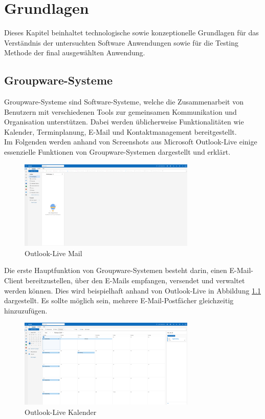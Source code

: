 \chapter{Grundlagen}

Dieses Kapitel beinhaltet technologische sowie konzeptionelle Grundlagen für das \\
Verständnis der untersuchten Software Anwendungen sowie für die Testing Methode der final ausgewählten Anwendung.

\section{Groupware-Systeme}

Groupware-Systeme sind Software-Systeme, welche die Zusammenarbeit von Benutzern mit verschiedenen Tools zur gemeinsamen Kommunikation und Organisation unterstützen.
Dabei werden üblicherweise Funktionalitäten wie Kalender, Terminplanung, E-Mail und Kontaktmanagement bereitgestellt.
\\
Im Folgenden werden anhand von Screenshots aus Microsoft Outlook-Live einige essenzielle Funktionen von Groupware-Systemen dargestellt und erklärt.
\begin{figure}[H]
    \centering
    \includegraphics[width=0.75\textwidth]{images/OutlookLive_Mail1.png}
    \caption{Outlook-Live Mail}
    \label{fig:outlook-live-mail}
\end{figure}
Die erste Hauptfunktion von Groupware-Systemen besteht darin, einen E-Mail-Client bereitzustellen, über den E-Mails empfangen, versendet und verwaltet werden können. Dies wird beispielhaft anhand von Outlook-Live in Abbildung \ref{fig:outlook-live-mail} dargestellt.
Es sollte möglich sein, mehrere E-Mail-Postfächer gleichzeitig hinzuzufügen.


\begin{figure}[H]
    \centering
    \includegraphics[width=0.75\textwidth]{images/OutlookLive_Calender1.png}
    \caption{Outlook-Live Kalender}
    \label{fig:outlook-live-calender}
\end{figure}

